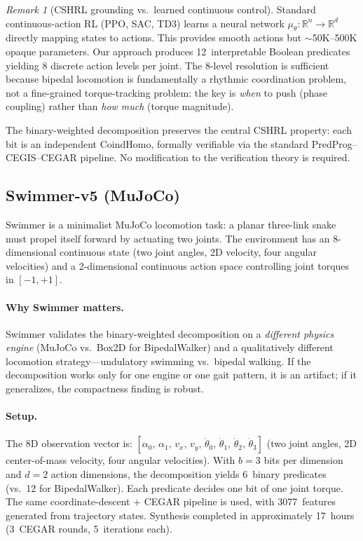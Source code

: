 \documentclass[9pt,a4paper]{article}
\theoremstyle{plain}
\theoremstyle{definition}
\theoremstyle{remark}
\newtheorem{remark}{Remark}
\begin{document}
\begin{remark}[CSHRL grounding vs.\ learned continuous control]
Standard continuous-action RL (PPO, SAC, TD3) learns a neural
network $\mu_\theta: \mathbb{R}^n \to \mathbb{R}^d$ directly
mapping states to actions.  This provides smooth actions but
$\sim$50K--500K opaque parameters.  Our approach produces
12~interpretable Boolean predicates yielding 8 discrete action
levels per joint.  The 8-level resolution is sufficient because
bipedal locomotion is fundamentally a rhythmic coordination
problem, not a fine-grained torque-tracking problem: the key
is \emph{when} to push (phase coupling) rather than \emph{how
much} (torque magnitude).

The binary-weighted decomposition preserves the central CSHRL
property: each bit is an independent CoindHomo, formally
verifiable via the standard PredProg--CEGIS--CEGAR pipeline.
No modification to the verification theory is required.
\end{remark}

\subsection{Swimmer-v5 (MuJoCo)}

Swimmer is a minimalist MuJoCo locomotion task: a planar
three-link snake must propel itself forward by actuating two
joints.  The environment has an 8-dimensional continuous state
(two joint angles, 2D velocity, four angular velocities) and a
2-dimensional continuous action space controlling joint torques
in $[-1, +1]$.

\paragraph{Why Swimmer matters.}
Swimmer validates the binary-weighted decomposition on a
\emph{different physics engine} (MuJoCo vs.\ Box2D for
BipedalWalker) and a qualitatively different locomotion
strategy---undulatory swimming vs.\ bipedal walking.
If the decomposition works only for one engine or one gait
pattern, it is an artifact; if it generalizes, the compactness
finding is robust.

\paragraph{Setup.}
The 8D observation vector is:
$[\alpha_0,\, \alpha_1,\, v_x,\, v_y,\,
  \dot\theta_0,\, \dot\theta_1,\, \dot\theta_2,\, \dot\theta_3]$
(two joint angles, 2D center-of-mass velocity, four angular
velocities).  With $b = 3$ bits per dimension and $d = 2$
action dimensions, the decomposition yields 6~binary predicates
(vs.\ 12 for BipedalWalker).  Each predicate decides one bit of
one joint torque.  The same coordinate-descent + CEGAR pipeline
is used, with 3077~features generated from trajectory states.
Synthesis completed in approximately 17~hours (3~CEGAR rounds,
5~iterations each).
\end{document}
